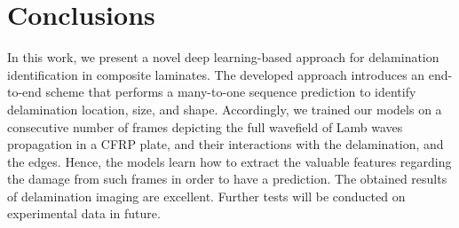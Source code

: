 \documentclass{IOS-Book-Article}
\begin{document}
\section{Conclusions}
	In this work, we present a novel deep learning-based approach for delamination identification in composite laminates.
	The developed approach introduces an end-to-end scheme that performs a many-to-one sequence prediction to identify delamination location, size, and shape.
	Accordingly, we trained our models on a consecutive number of frames depicting the full wavefield of Lamb waves propagation in a CFRP plate, and their interactions with the delamination, and the edges.
	Hence, the models learn how to extract the valuable features regarding the damage from such frames in order to have a prediction.
	The obtained results of delamination imaging are excellent. Further tests will be conducted on experimental data in future.
\end{document}

